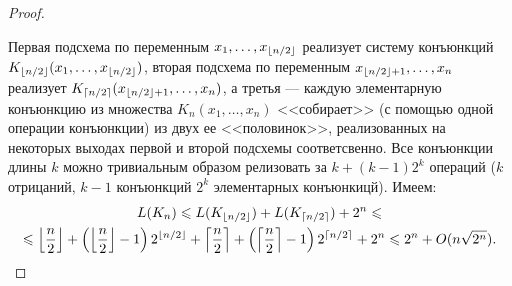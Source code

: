 \begin{proof}
\begin{center}
    \end{center}
    Первая подсхема по переменным $x_1, \ldots, x_{\left\lfloor n/2 \right\rfloor}$ реализует систему конъюнкций $K_{\left\lfloor n/2 \right\rfloor}(x_1, \ldots, x_{\left\lfloor n/2 \right\rfloor})$, вторая подсхема по переменным $x_{\left\lfloor n/2 \right\rfloor+1}, \ldots, x_n$ реализует $K_{\left\lceil {n/2} \right\rceil}(x_{\left\lfloor n/2 \right\rfloor+1}, \ldots, x_n)$, а третья --- каждую элементарную конъюнкцию из множества $K_n(x_1, \ldots, x_n)$ <<собирает>> (с помощью одной операции конъюнкции) из двух ее <<половинок>>, реализованных на некоторых выходах первой и второй подсхемы соответсвенно. Все конъюнкции длины $k$ можно тривиальным образом релизовать за $k+(k-1)2^k$ операций ($k$ отрицаний, $k-1$ конъюнкций $2^k$ элементарных конъюнкицй). Имеем:
    \begin{multline*}
        L(K_n) \leqslant L(K_{\left\lfloor n/2 \right\rfloor}) + L(K_{\left\lceil {n/2} \right\rceil}) + 2^n \leqslant \\
        \leqslant \left\lfloor \dfrac{n}{2} \right\rfloor + \left(\left\lfloor \dfrac{n}{2} \right\rfloor-1\right)2^{\left\lfloor n/2 \right\rfloor} + \left\lceil {\dfrac{n}{2}} \right\rceil + \left(\left\lceil {\dfrac{n}{2}} \right\rceil-1\right)2^{\left\lceil {n/2} \right\rceil} + 2^n \leqslant 2^n + O(n\sqrt{2^n}).
    \end{multline*}
\end{proof}


